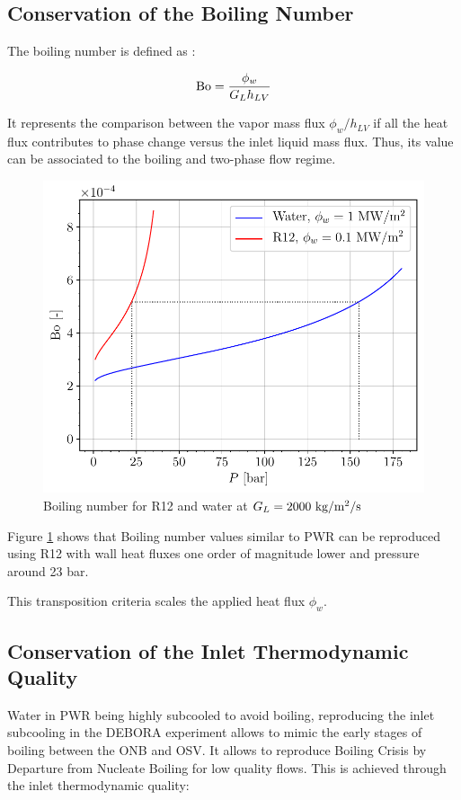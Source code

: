 \subsection{Conservation of the Boiling Number}

The boiling number is defined as :

\begin{equation}
\mathrm{Bo} = \frac{\phi_{w}}{G_{L}h_{LV}}
\end{equation}  

It represents the comparison between the vapor mass flux $\phi_{w}/h_{LV}$ if all the heat flux contributes to phase change versus the inlet liquid mass flux. Thus, its value can be associated to the boiling and two-phase flow regime.

\begin{figure}[!h]
\centering
\includegraphics[width=0.6\linewidth]{img/DEBORA/Bo_R12_PWR.pdf}
\caption{Boiling number for R12 and water at $G_{L} = 2000~\text{kg/m$^{2}$/s}$}
\label{fig:Bo_R12_PWR}
\end{figure}

Figure \ref{fig:Bo_R12_PWR} shows that Boiling number values similar to PWR can be reproduced using R12 with wall heat fluxes one order of magnitude lower and pressure around 23 bar.


\begin{note*}{}
This transposition criteria scales the applied heat flux $\phi_{w}$.
\end{note*}

\subsection{Conservation of the Inlet Thermodynamic Quality}

Water in PWR being highly subcooled to avoid boiling, reproducing the inlet subcooling in the DEBORA experiment allows to mimic the early stages of boiling between the ONB and OSV. It allows to reproduce Boiling Crisis by Departure from Nucleate Boiling for low quality flows. This is achieved through the inlet thermodynamic quality:


